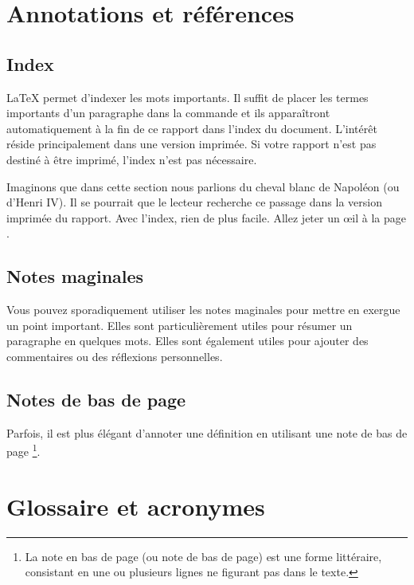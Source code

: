\section{Annotations et références}

\subsection{Index}
\LaTeX{} permet d'indexer les mots  importants. Il suffit de placer les termes importants d'un paragraphe dans la commande \texttt{} et ils apparaîtront automatiquement à la fin de ce rapport dans l'index du document. L'intérêt réside principalement dans une version imprimée. Si votre rapport n'est pas destiné à être imprimé, l'index n'est pas nécessaire.


Imaginons que dans cette section nous parlions du cheval blanc  de Napoléon (ou d'Henri IV). Il se pourrait que le lecteur recherche ce passage dans la version imprimée du rapport. Avec l'index, rien de plus facile. Allez jeter un œil à la page \pageref{index}.

\subsection{Notes maginales}

 Vous pouvez sporadiquement utiliser les notes maginales pour mettre en exergue un point important. Elles sont particulièrement utiles pour résumer un paragraphe en quelques mots. Elles sont également utiles pour ajouter des commentaires ou des réflexions personnelles.

\subsection{Notes de bas de page}

Parfois, il est plus élégant d'annoter une définition en utilisant une note de bas de page \footnote{La note en bas de page (ou note de bas de page) est une forme littéraire, consistant en une ou plusieurs lignes ne figurant pas dans le texte.}.

\section{Glossaire et acronymes}

